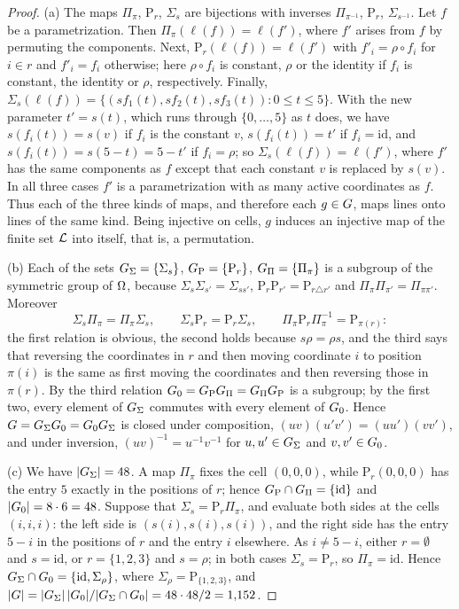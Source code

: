 \begin{proof}
(a) The maps $\Pi_\pi$, $\mathrm{P}_r$, $\Sigma_s$ are bijections with inverses $\Pi_{\pi^{-1}}$,
$\mathrm{P}_r$, $\Sigma_{s^{-1}}$. Let $f$ be a parametrization. Then $\Pi_\pi(\ell(f))=\ell(f')$, where
$f'$ arises from $f$ by permuting the components. Next, $\mathrm{P}_r(\ell(f))=\ell(f')$ with
$f'_i=\rho\circ f_i$ for $i\in r$ and $f'_i=f_i$ otherwise; here $\rho\circ f_i$ is constant, $\rho$ or the
identity if $f_i$ is constant, the identity or $\rho$, respectively. Finally,
$\Sigma_s(\ell(f))=\{(s f_1(t),s f_2(t),s f_3(t)):0\le t\le 5\}$. With the new parameter $t'=s(t)$, which
runs through $\{0,\dots,5\}$ as $t$ does, we have $s(f_i(t))=s(v)$ if $f_i$ is the constant $v$,
$s(f_i(t))=t'$ if $f_i=\mathrm{id}$, and $s(f_i(t))=s(5-t)=5-t'$ if $f_i=\rho$; so
$\Sigma_s(\ell(f))=\ell(f')$, where $f'$ has the same components as $f$ except that each constant $v$ is
replaced by $s(v)$. In all three cases $f'$ is a parametrization with as many active coordinates as $f$.
Thus each of the three kinds of maps, and therefore each $g\in G$, maps lines onto lines of the same kind.
Being injective on cells, $g$ induces an injective map of the finite set $\mathcal{L}$ into itself, that is, a
permutation.

(b) Each of the sets $G_\Sigma=\{\Sigma_s\}$, $G_{\mathrm P}=\{\mathrm{P}_r\}$, $G_\Pi=\{\Pi_\pi\}$ is a
subgroup of the symmetric group of $\Omega$, because $\Sigma_s\Sigma_{s'}=\Sigma_{ss'}$,
$\mathrm{P}_r\mathrm{P}_{r'}=\mathrm{P}_{r\triangle r'}$ and $\Pi_\pi\Pi_{\pi'}=\Pi_{\pi\pi'}$. Moreover
\[
  \Sigma_s\Pi_\pi=\Pi_\pi\Sigma_s,\qquad \Sigma_s\mathrm{P}_r=\mathrm{P}_r\Sigma_s,\qquad
  \Pi_\pi\mathrm{P}_r\Pi_\pi^{-1}=\mathrm{P}_{\pi(r)}:
\]
the first relation is obvious, the second holds because $s\rho=\rho s$, and the third says that reversing
the coordinates in $r$ and then moving coordinate $i$ to position $\pi(i)$ is the same as first moving
the coordinates and then reversing those in $\pi(r)$. By the third relation
$G_0=G_{\mathrm P}G_\Pi=G_\Pi G_{\mathrm P}$ is a subgroup; by the first two, every element of $G_\Sigma$
commutes with every element of $G_0$. Hence $G=G_\Sigma G_0=G_0G_\Sigma$ is closed under composition,
$(uv)(u'v')=(uu')(vv')$, and under inversion,
$(uv)^{-1}=u^{-1}v^{-1}$ for $u,u'\in G_\Sigma$ and $v,v'\in G_0$.

(c) We have $|G_\Sigma|=48$. A map $\Pi_\pi$ fixes the cell $(0,0,0)$, while $\mathrm{P}_r(0,0,0)$ has the
entry $5$ exactly in the positions of $r$; hence $G_{\mathrm P}\cap G_\Pi=\{\mathrm{id}\}$ and
$|G_0|=8\cdot 6=48$. Suppose that $\Sigma_s=\mathrm{P}_r\Pi_\pi$, and evaluate both sides at the cells
$(i,i,i)$: the left side is $(s(i),s(i),s(i))$, and the right side has the entry $5-i$ in the positions of
$r$ and the entry $i$ elsewhere. As $i\ne 5-i$, either $r=\emptyset$ and $s=\mathrm{id}$, or $r=\{1,2,3\}$
and $s=\rho$; in both cases $\Sigma_s=\mathrm{P}_r$, so $\Pi_\pi=\mathrm{id}$. Hence
$G_\Sigma\cap G_0=\{\mathrm{id},\Sigma_\rho\}$, where $\Sigma_\rho=\mathrm{P}_{\{1,2,3\}}$, and
$|G|=|G_\Sigma|\,|G_0|/|G_\Sigma\cap G_0|=48\cdot 48/2=1{,}152$.


\end{proof}

